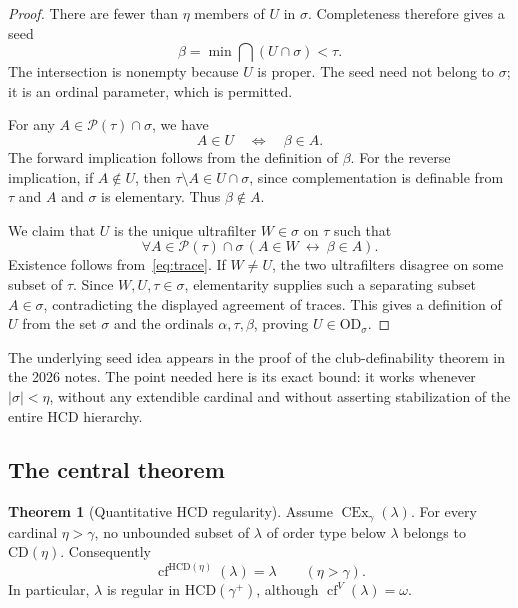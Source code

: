 \documentclass[11pt,letterpaper]{article}
\theoremstyle{definition}
\newtheorem{theorem}[definition]{Theorem}
\newcommand{\OD}{\mathrm{OD}}
\newcommand{\CEx}{\operatorname{CEx}}
\newcommand{\cf}{\operatorname{cf}}
\newcommand{\HCD}{\mathrm{HCD}}
\newcommand{\CD}{\mathrm{CD}}
\newcommand{\Pow}{\mathcal{P}}
\newcommand{\Cex}[2]{\CEx_{#1}(#2)}
\theoremstyle{remark}
\begin{document}
\begin{proof}
There are fewer than $\eta$ members of $U$ in $\sigma$. Completeness therefore gives a seed
\[
 \beta=\min\bigcap(U\cap\sigma)<\tau.
\]
The intersection is nonempty because $U$ is proper. The seed need not belong to $\sigma$; it is an ordinal parameter, which is permitted.

For any $A\in\Pow(\tau)\cap\sigma$, we have
\begin{equation}
 A\in U\quad\Longleftrightarrow\quad\beta\in A.\label{eq:trace}
\end{equation}
The forward implication follows from the definition of $\beta$. For the reverse implication, if $A\notin U$, then $\tau\setminus A\in U\cap\sigma$, since complementation is definable from $\tau$ and $A$ and $\sigma$ is elementary. Thus $\beta\notin A$.

We claim that $U$ is the unique ultrafilter $W\in\sigma$ on $\tau$ such that
\[
 \forall A\in\Pow(\tau)\cap\sigma\,
       (A\in W\ \longleftrightarrow\ \beta\in A).
\]
Existence follows from~\eqref{eq:trace}. If $W\neq U$, the two ultrafilters disagree on some subset of $\tau$. Since $W,U,\tau\in\sigma$, elementarity supplies such a separating subset $A\in\sigma$, contradicting the displayed agreement of traces. This gives a definition of $U$ from the set $\sigma$ and the ordinals $\alpha,\tau,\beta$, proving $U\in\OD_\sigma$.
\end{proof}

The underlying seed idea appears in the proof of the club-definability theorem in the 2026 notes. The point needed here is its exact bound: it works whenever $|\sigma|<\eta$, without any extendible cardinal and without asserting stabilization of the entire HCD hierarchy.\cite[proof of Theorem 3.7]{cover}

\subsection{The central theorem}

\begin{theorem}[Quantitative HCD regularity]\label{thm:regular}
Assume $\Cex{\gamma}{\lambda}$. For every cardinal $\eta>\gamma$, no unbounded subset of $\lambda$ of order type below $\lambda$ belongs to $\CD(\eta)$. Consequently
\begin{equation}
 \cf^{\HCD(\eta)}(\lambda)=\lambda
 \qquad(\eta>\gamma).\label{eq:hcd-regular}
\end{equation}
In particular, $\lambda$ is regular in $\HCD(\gamma^+)$, although $\cf^V(\lambda)=\omega$.
\end{theorem}
\end{document}
